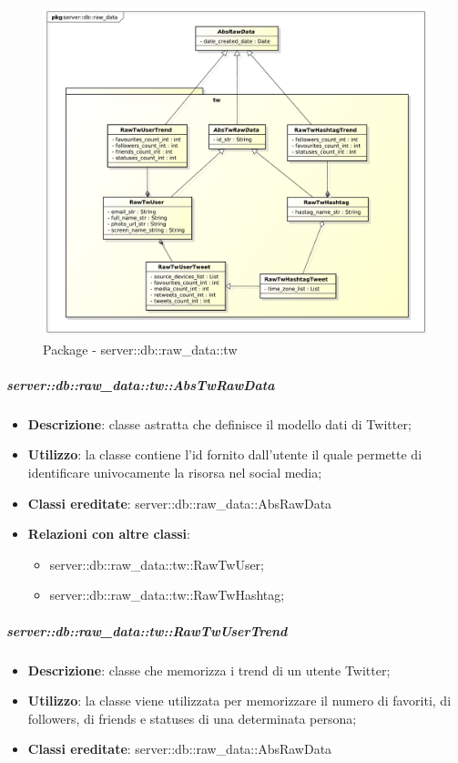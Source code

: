 

		\begin{figure}[htbp]
			\centering
			\centerline{\includegraphics[scale=0.45]{./images/server/raw_data_tw.pdf}}
			\caption{Package - server::db::raw\_data::tw}
		\end{figure}


		\subparagraph{server::db::raw\_data::tw::AbsTwRawData} %
		\label{subp:server_db_raw_data_tw_abstwrawdata}
			\begin{itemize}
				\item \textbf{Descrizione}: classe astratta che definisce il modello dati di Twitter;
				\item \textbf{Utilizzo}: la classe contiene l'id fornito dall'utente il quale permette di identificare univocamente la risorsa nel social media;
				\item \textbf{Classi ereditate}: server::db::raw\_data::AbsRawData
				\item \textbf{Relazioni con altre classi}:
					\begin{itemize}
						\item server::db::raw\_data::tw::RawTwUser;
						\item server::db::raw\_data::tw::RawTwHashtag;
					\end{itemize}
			\end{itemize}


		\subparagraph{server::db::raw\_data::tw::RawTwUserTrend} %
		\label{subp:server_db_raw_data_tw_rawigusertrend}
			\begin{itemize}
				\item \textbf{Descrizione}: classe che memorizza i trend di un utente Twitter;
				\item \textbf{Utilizzo}: la classe viene utilizzata per memorizzare il numero di favoriti, di followers, di friends e statuses di una determinata persona;
				\item \textbf{Classi ereditate}: server::db::raw\_data::AbsRawData
			\end{itemize}


